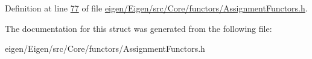 Definition at line \hyperlink{eigen_2_eigen_2src_2_core_2functors_2_assignment_functors_8h_source_l00077}{77} of file \hyperlink{eigen_2_eigen_2src_2_core_2functors_2_assignment_functors_8h_source}{eigen/\+Eigen/src/\+Core/functors/\+Assignment\+Functors.\+h}.



The documentation for this struct was generated from the following file\+:\begin{DoxyCompactItemize}
\item 
eigen/\+Eigen/src/\+Core/functors/\+Assignment\+Functors.\+h\end{DoxyCompactItemize}

